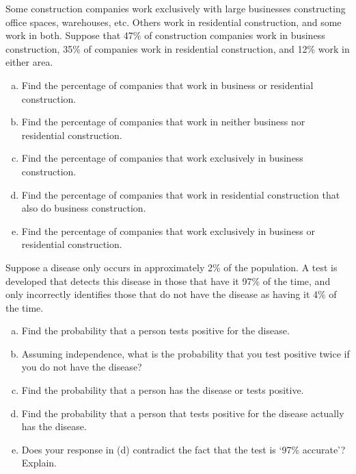 \documentclass[11pt,letterpaper]{article}
\begin{document}
\newpage



 Some construction companies work exclusively with large businesses constructing office spaces, warehouses, etc. Others work in residential construction, and some work in both. Suppose that 47\% of construction companies work in business construction, 35\% of companies work in residential construction, and 12\% work in either area. 
        \begin{enumerate}[(a)]
        \item Find the percentage of companies that work in business or residential construction.
        \item Find the percentage of companies that work in neither business nor residential construction.
        \item Find the percentage of companies that work exclusively in business construction.
        \item Find the percentage of companies that work in residential construction that also do business construction.
        \item Find the percentage of companies that work exclusively in business or residential construction. 
        \end{enumerate} 



\newpage



 Suppose a disease only occurs in approximately 2\% of the population. A test is developed that detects this disease in those that have it 97\% of the time, and only incorrectly identifies those that do not have the disease as having it 4\% of the time. 
	\begin{enumerate}[(a)]
	\item Find the probability that a person tests positive for the disease. 
	\item Assuming independence, what is the probability that you test positive twice if you do not have the disease?
	\item Find the probability that a person has the disease or tests positive. 
	\item Find the probability that a person that tests positive for the disease actually has the disease. 
	\item Does your response in (d) contradict the fact that the test is `97\% accurate'? Explain. 
	\end{enumerate}
\end{document}

